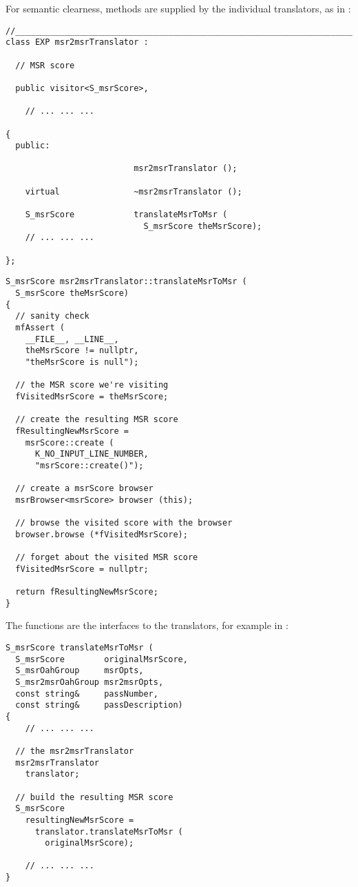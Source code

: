 For semantic clearness,  methods are supplied by the individual translators, as in :
\begin{lstlisting}[language=CPlusPlus]
//________________________________________________________________________
class EXP msr2msrTranslator :

  // MSR score

  public visitor<S_msrScore>,

	// ... ... ...

{
  public:

                          msr2msrTranslator ();

    virtual               ~msr2msrTranslator ();

    S_msrScore            translateMsrToMsr (
                            S_msrScore theMsrScore);
	// ... ... ...

};
\end{lstlisting}

\begin{lstlisting}[language=CPlusPlus]
S_msrScore msr2msrTranslator::translateMsrToMsr (
  S_msrScore theMsrScore)
{
  // sanity check
  mfAssert (
    __FILE__, __LINE__,
    theMsrScore != nullptr,
    "theMsrScore is null");

  // the MSR score we're visiting
  fVisitedMsrScore = theMsrScore;

  // create the resulting MSR score
  fResultingNewMsrScore =
    msrScore::create (
      K_NO_INPUT_LINE_NUMBER,
      "msrScore::create()");

  // create a msrScore browser
  msrBrowser<msrScore> browser (this);

  // browse the visited score with the browser
  browser.browse (*fVisitedMsrScore);

  // forget about the visited MSR score
  fVisitedMsrScore = nullptr;

  return fResultingNewMsrScore;
}
\end{lstlisting}

The  functions are the interfaces to the translators, for example in :
\begin{lstlisting}[language=CPlusPlus]
S_msrScore translateMsrToMsr (
  S_msrScore        originalMsrScore,
  S_msrOahGroup     msrOpts,
  S_msr2msrOahGroup msr2msrOpts,
  const string&     passNumber,
  const string&     passDescription)
{
	// ... ... ...

  // the msr2msrTranslator
  msr2msrTranslator
    translator;

  // build the resulting MSR score
  S_msrScore
    resultingNewMsrScore =
      translator.translateMsrToMsr (
        originalMsrScore);

	// ... ... ...
}
\end{lstlisting}


